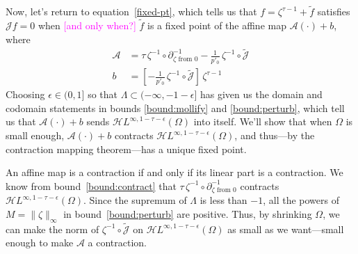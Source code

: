\documentclass{article}
\theoremstyle{plain}
\newcommand{\holoL}[1]{\mathcal{H}L^{#1}} %
\begin{document}
Now, let's return to equation~\ref{fixed-pt}, which tells us that $f = \zeta^{\tau-1} + \tilde{f}$ satisfies $\mathcal{J}f = 0$ when \textcolor{magenta}{[and only when?]} $\tilde{f}$ is a fixed point of the affine map $\mathcal{A}(\cdot) + b$, where
\begin{align*}
\mathcal{A} & = \tau\,\zeta^{-1} \circ \partial^{-1}_{\zeta \text{ from } 0} - \tfrac{1}{p'_0}\,\zeta^{-1} \circ \tilde{\mathcal{J}} \\
b & = \left[ -\tfrac{1}{p'_0}\,\zeta^{-1} \circ \tilde{\mathcal{J}} \right]\,\zeta^{\tau-1}
\end{align*}
Choosing $\epsilon \in (0, 1]$ so that $\Lambda \subset (-\infty, -1 - \epsilon]$ has given us the domain and codomain statements in bounds \ref{bound:mollify} and \ref{bound:perturb}, which tell us that $\mathcal{A}(\cdot) + b$ sends $\holoL{\infty, 1-\tau-\epsilon}(\Omega)$ into itself. We'll show that when $\Omega$ is small enough, $\mathcal{A}(\cdot) + b$ contracts $\holoL{\infty, 1-\tau-\epsilon}(\Omega)$, and thus---by the contraction mapping theorem---has a unique fixed point.

An affine map is a contraction if and only if its linear part is a contraction. We know from bound~\ref{bound:contract} that $\tau\,\zeta^{-1} \circ \partial^{-1}_{\zeta \text{ from } 0}$ contracts $\holoL{\infty, 1-\tau-\epsilon}(\Omega)$. Since the supremum of $\Lambda$ is less than $-1$, all the powers of $M = \|\zeta\|_\infty$ in bound~\ref{bound:perturb} are positive. Thus, by shrinking $\Omega$, we can make the norm of $\zeta^{-1} \circ \tilde{\mathcal{J}}$ on $\holoL{\infty, 1-\tau-\epsilon}(\Omega)$ as small as we want---small enough to make $\mathcal{A}$ a contraction.
\end{document}
